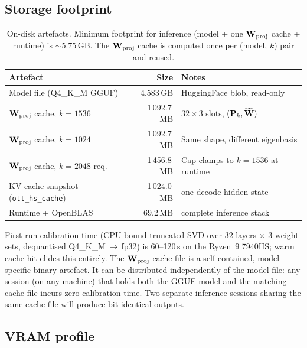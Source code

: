 \documentclass[11pt]{article}
\begin{document}
\subsection{Storage footprint}

\begin{table}[h]\centering\footnotesize
\caption{On-disk artefacts. Minimum footprint for inference (model + one
$\mathbf{W}_\text{proj}$ cache + runtime) is ${\sim}5.75$\,GB. The
$\mathbf{W}_\text{proj}$ cache is computed once per (model, $k$) pair and reused.}
\begin{tabular}{@{}lrl@{}}
\toprule
Artefact & Size & Notes\\
\midrule
Model file (Q4\_K\_M GGUF)                  & 4.583\,GB   & HuggingFace blob, read-only\\
$\mathbf{W}_\text{proj}$ cache, $k{=}1536$       & 1\,092.7\,MB & $32{\times}3$ slots, $(\mathbf{P}_k,\widetilde{\mathbf{W}})$\\
$\mathbf{W}_\text{proj}$ cache, $k{=}1024$       & 1\,092.7\,MB & Same shape, different eigenbasis\\
$\mathbf{W}_\text{proj}$ cache, $k{=}2048$ req.\ & 1\,456.8\,MB & Cap clamps to $k{=}1536$ at runtime\\
KV-cache snapshot (\texttt{ott\_hs\_cache}) & 1\,024.0\,MB & one-decode hidden state\\
Runtime + OpenBLAS                          & 69.2\,MB     & complete inference stack\\
\bottomrule
\end{tabular}
\end{table}

First-run calibration time (CPU-bound truncated SVD over 32 layers $\times$
3 weight sets, dequantised Q4\_K\_M\,$\to$\,fp32) is 60--120\,s on the
Ryzen~9 7940HS; warm cache hit elides this entirely.
The $\mathbf{W}_\text{proj}$ cache file is a self-contained, model-specific
binary artefact. It can be distributed independently of the model file:
any session (on any machine) that holds both the GGUF model and the
matching cache file incurs zero calibration time.  Two separate inference
sessions sharing the same cache file will produce bit-identical outputs.

\subsection{VRAM profile}
\end{document}
